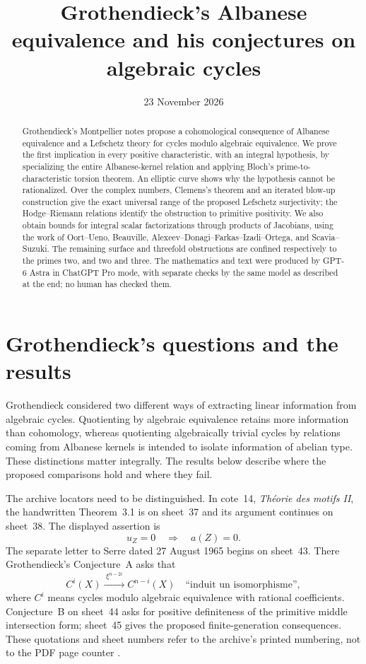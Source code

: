 \documentclass[11pt]{article}
\title{Grothendieck's Albanese equivalence and his conjectures on algebraic cycles}
\author{}
\date{23 November 2026}
\theoremstyle{definition}
\theoremstyle{remark}
\begin{document}
\maketitle
\begin{abstract}
Grothendieck's Montpellier notes propose a cohomological consequence of Albanese equivalence and a Lefschetz theory for cycles modulo algebraic equivalence. We prove the first implication in every positive characteristic, with an integral hypothesis, by specializing the entire Albanese-kernel relation and applying Bloch's prime-to-characteristic torsion theorem. An elliptic curve shows why the hypothesis cannot be rationalized. Over the complex numbers, Clemens's theorem and an iterated blow-up construction give the exact universal range of the proposed Lefschetz surjectivity; the Hodge--Riemann relations identify the obstruction to primitive positivity. We also obtain bounds for integral scalar factorizations through products of Jacobians, using the work of Oort--Ueno, Beauville, Alexeev--Donagi--Farkas--Izadi--Ortega, and Scavia--Suzuki. The remaining surface and threefold obstructions are confined respectively to the primes two, and two and three. The mathematics and text were produced by GPT-6 Astra in ChatGPT Pro mode, with separate checks by the same model as described at the end; no human has checked them.
\end{abstract}

\section{Grothendieck's questions and the results}

Grothendieck considered two different ways of extracting linear information from algebraic cycles. Quotienting by algebraic equivalence retains more information than cohomology, whereas quotienting algebraically trivial cycles by relations coming from Albanese kernels is intended to isolate information of abelian type. These distinctions matter integrally. The results below describe where the proposed comparisons hold and where they fail.

The archive locators need to be distinguished. In cote~14, \emph{Th\'eorie des motifs II}, the handwritten Theorem~3.1 is on sheet~37 and its argument continues on sheet~38. The displayed assertion is
\begin{equation}\label{eq:archive}
             u_Z=0\quad\Longrightarrow\quad a(Z)=0.
\end{equation}
The separate letter to Serre dated 27 August 1965 begins on sheet~43. There Grothendieck's Conjecture~A asks that
\[
 C^i(X)\xrightarrow{\;\xi^{n-2i}\;}C^{n-i}(X)
 \quad\text{``induit un isomorphisme''},
\]
where $C^i$ means cycles modulo algebraic equivalence with rational coefficients. Conjecture~B on sheet~44 asks for positive definiteness of the primitive middle intersection form; sheet~45 gives the proposed finite-generation consequences. These quotations and sheet numbers refer to the archive's printed numbering, not to the PDF page counter \cite{Grothendieck}.
\end{document}
